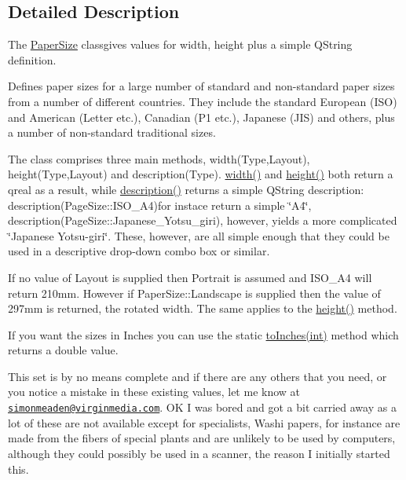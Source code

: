 \subsection{Detailed Description}
The \mbox{\hyperlink{classPaperSize}{Paper\+Size}} classgives values for width, height plus a simple Q\+String definition. 

Defines paper sizes for a large number of standard and non-\/standard paper sizes from a number of different countries. They include the standard European (I\+SO) and American (Letter etc.), Canadian (P1 etc.), Japanese (J\+IS) and others, plus a number of non-\/standard traditional sizes.

The class comprises three main methods, {\ttfamily width(\+Type,\+Layout)}, {\ttfamily height(\+Type,\+Layout)} and {\ttfamily description(\+Type)}. {\ttfamily \mbox{\hyperlink{classPaperSize_ac19b82ac30b91bc4223a333a2631f65e}{width()}}} and {\ttfamily \mbox{\hyperlink{classPaperSize_a185becbda27217b5df2bccc27f29bf4b}{height()}}} both return a {\ttfamily qreal} as a result, while {\ttfamily \mbox{\hyperlink{classPaperSize_a829638b64da7c339430b9737e438c073}{description()}}} returns a simple {\ttfamily Q\+String} description\+: {\ttfamily description(\+Page\+Size\+::\+I\+S\+O\+\_\+\+A4)for} instace return a simple \char`\"{}\+A4\char`\"{}, {\ttfamily description(\+Page\+Size\+::\+Japanese\+\_\+\+Yotsu\+\_\+giri)}, however, yields a more complicated \char`\"{}\+Japanese
\+Yotsu-\/giri\char`\"{}. These, however, are all simple enough that they could be used in a descriptive drop-\/down combo box or similar.

If no value of {\ttfamily Layout} is supplied then Portrait is assumed and I\+S\+O\+\_\+\+A4 will return 210mm. However if {\ttfamily Paper\+Size\+::\+Landscape} is supplied then the value of 297mm is returned, the rotated width. The same applies to the {\ttfamily \mbox{\hyperlink{classPaperSize_a185becbda27217b5df2bccc27f29bf4b}{height()}}} method.

If you want the sizes in Inches you can use the static {\ttfamily \mbox{\hyperlink{classPaperSize_ac4b94da1c955bcf6b733d99f3b3a416d}{to\+Inches(int)}}} method which returns a {\ttfamily double} value.

This set is by no means complete and if there are any others that you need, or you notice a mistake in these existing values, let me know at \href{mailto:simonmeaden@virginmedia.com}{\tt simonmeaden@virginmedia.\+com}. OK I was bored and got a bit carried away as a lot of these are not available except for specialists, Washi papers, for instance are made from the fibers of special plants and are unlikely to be used by computers, although they could possibly be used in a scanner, the reason I initially started this. 

